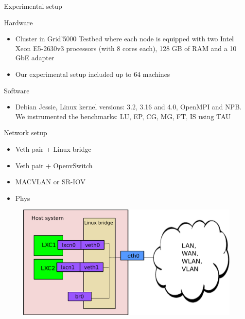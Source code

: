 \documentclass[11pt,xcolor=dvipsnames,presentation]{beamer}
\begin{document}
\begin{frame}[label=sec-4-0-4]{Experimental setup}
\begin{block}{Hardware}
\begin{itemize}
\item Cluster in Grid'5000 Testbed where each node is equipped
with two Intel Xeon E5-2630v3 processors (with 8 cores each), 128 GB of RAM and a 10 GbE adapter
\item Our experimental setup included up to 64 machines
\end{itemize}
\end{block}

\begin{block}{Software}
\begin{itemize}
\item Debian Jessie, Linux kernel versions: 3.2, 3.16 and 4.0, OpenMPI and NPB.
We instrumented the benchmarks: LU, EP, CG, MG, FT, IS using TAU
\end{itemize}
\end{block}
\end{frame}


\begin{frame}[label=sec-4-0-5]{Network setup}
\begin{itemize}
\item \alert{Veth pair + Linux bridge}
\item Veth pair + OpenvSwitch
\item MACVLAN or SR-IOV
\item Phys
\end{itemize}

\begin{figure}[!h]
  \center
  \includegraphics[scale=0.4]{figures/lxc-veth.pdf}
  \label{fig:hpc}
\end{figure}
\end{frame}
\end{document}
